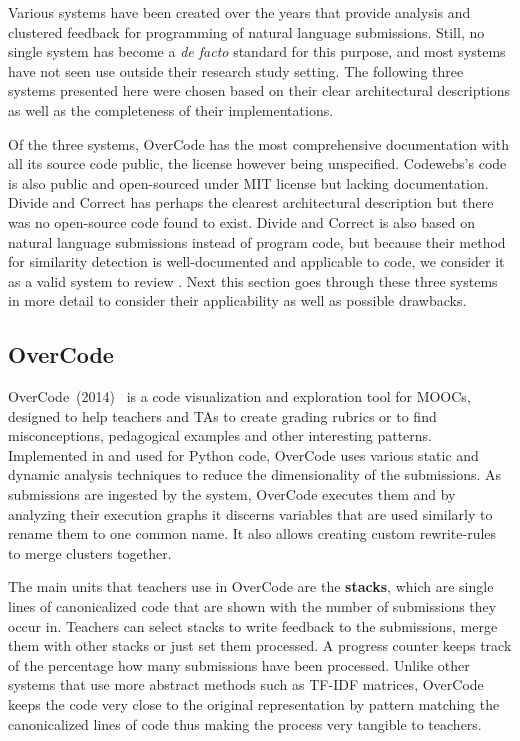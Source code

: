 Various systems have been created over the years that provide analysis and clustered feedback for programming of natural language submissions. Still, no single system has become a \textit{de facto} standard for this purpose, and most systems have not seen use outside their research study setting. The following three systems presented here were chosen based on their clear architectural descriptions as well as the completeness of their implementations.

Of the three systems, OverCode has the most comprehensive documentation with all its source code public, the license however being unspecified. Codewebs's code is also public and open-sourced under MIT license but lacking documentation. Divide and Correct has perhaps the clearest architectural description but there was no open-source code found to exist. Divide and Correct is also based on natural language submissions instead of program code, but because their method for similarity detection is well-documented and applicable to code, we consider it as a valid system to review \cite{overcode, codewebs, divide-and-correct}. Next this section goes through these three systems in more detail to consider their applicability as well as possible drawbacks.

\subsection{OverCode}

OverCode~(2014)~\cite{overcode} is a code visualization and exploration tool for MOOCs, designed to help teachers and TAs to create grading rubrics or to find misconceptions, pedagogical examples and other interesting patterns. Implemented in and used for Python code, OverCode uses various static and dynamic analysis techniques to reduce the dimensionality of the submissions. As submissions are ingested by the system, OverCode executes them and by analyzing their execution graphs it discerns variables that are used similarly to rename them to one common name. It also allows creating custom rewrite-rules to merge clusters together.

The main units that teachers use in OverCode are the \textbf{stacks}, which are single lines of canonicalized code that are shown with the number of submissions they occur in. Teachers can select stacks to write feedback to the submissions, merge them with other stacks or just set them processed. A progress counter keeps track of the percentage how many submissions have been processed. Unlike other systems that use more abstract methods such as TF-IDF matrices, OverCode keeps the code very close to the original representation by pattern matching the canonicalized lines of code thus making the process very tangible to teachers.

